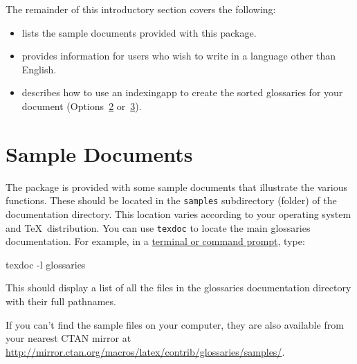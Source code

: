 \documentclass[report,inlinetitle]{nlctdoc}
\newcommand*{\optsor}[2]{Options~\hyperlink{option#1}{#1}
or~\hyperlink{option#2}{#2}}
\newcounter{sample}
\begin{document}
The remainder of this introductory section covers the following:
\begin{itemize}
\item {} lists the sample documents provided 
with this package.

\item {} provides information for users who
wish to write in a language other than English.

\item {} describes how to use an
\gls{indexingapp} to create the sorted glossaries for your document
(\optsor23).

\end{itemize}

\section{Sample Documents}
\label{sec:samples}

The  package is provided with some sample
documents that illustrate the various functions. These should
be located in the \texttt{samples} subdirectory (folder) of the
 documentation directory. This location varies
according to your operating system and \TeX\ distribution. You
can use \texttt{texdoc} to locate the main glossaries documentation.
For example, in a
\href{http://www.dickimaw-books.com/latex/novices/html/terminal.html}{terminal or command prompt}, type:
\begin{prompt}
texdoc -l glossaries
\end{prompt}
This should display a list of all the files in the glossaries
documentation directory with their full pathnames.

If you can't find the sample files on your computer, they are also available
from your nearest CTAN mirror at
\url{http://mirror.ctan.org/macros/latex/contrib/glossaries/samples/}.
\end{document}
